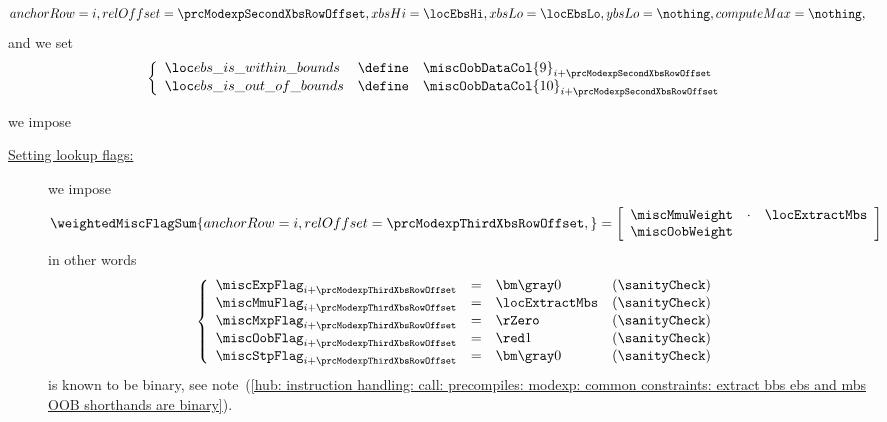 \begin{description}
\begin{description}
\[{						anchorRow  = i                            ,
						relOffset  = \prcModexpSecondXbsRowOffset ,
						xbsHi      = \locEbsHi                    ,
						xbsLo      = \locEbsLo                    ,
						ybsLo      = \nothing                     ,
						computeMax = \nothing                     ,
					}
				\]
				and we set
				\[
					\left\{ \begin{array}{lcl}
						\locEbsIsWithinBounds & \define & \miscOobDataCol{9}  _{i + \prcModexpSecondXbsRowOffset} \\
						\locEbsIsOutOfBounds  & \define & \miscOobDataCol{10} _{i + \prcModexpSecondXbsRowOffset} \\
					\end{array} \right.
				\]
		\end{description}
	\item[\underline{\underline{Miscellaneous row $n^°(i +  \prcModexpThirdXbsRowOffset)$:}}] we impose 
		\begin{description}
			\item[\underline{Setting lookup flags:}]
				we impose
				\[
					\weightedMiscFlagSum {
						anchorRow = i                           ,
						relOffset = \prcModexpThirdXbsRowOffset ,
					}
					=
					\left[ \begin{array}{crcl}
						\miscMmuWeight  & \cdot & \locExtractMbs \\
						\miscOobWeight \\
					\end{array} \right]
				\]
				in other words
				\[
					\left\{ \begin{array}{lclr}
						\miscExpFlag _{i + \prcModexpThirdXbsRowOffset} & = & \gZero         & (\sanityCheck) \\
						\miscMmuFlag _{i + \prcModexpThirdXbsRowOffset} & = & \locExtractMbs & (\sanityCheck) \\
						\miscMxpFlag _{i + \prcModexpThirdXbsRowOffset} & = & \rZero         & (\sanityCheck) \\
						\miscOobFlag _{i + \prcModexpThirdXbsRowOffset} & = & \one           & (\sanityCheck) \\
						\miscStpFlag _{i + \prcModexpThirdXbsRowOffset} & = & \gZero         & (\sanityCheck) \\
					\end{array} \right.
				\]
				\saNote{}
				\locExtractMbs{}
				is known to be binary,
				see note~(\ref{hub: instruction handling: call: precompiles: modexp: common constraints: extract bbs ebs and mbs OOB shorthands are binary}).

\end{description}
\end{description}
